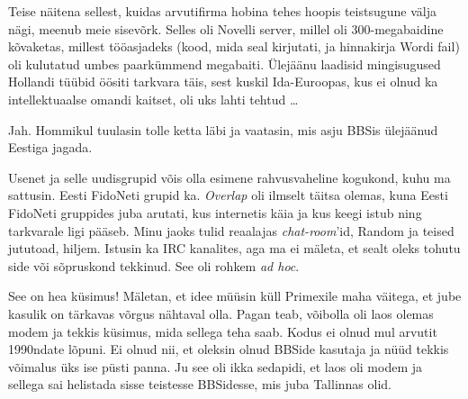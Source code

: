 Teise näitena sellest, kuidas arvutifirma hobina tehes hoopis 
teistsugune välja nägi, meenub meie sisevõrk. Selles oli Novelli server, 
millel oli 300-megabaidine kõvaketas, millest 
tööasjadeks (kood, mida seal 
kirjutati, ja hinnakirja Wordi fail) oli kulutatud umbes paarkümmend megabaiti. Ülejäänu laadisid 
mingisugused Hollandi tüübid öösiti tarkvara täis, sest 
kuskil Ida-Euroopas, kus ei olnud ka intellektuaalse 
omandi kaitset, oli uks lahti tehtud \ldots


Jah. Hommikul tuulasin tolle ketta läbi ja vaatasin, mis asju BBSis ülejäänud 
Eestiga jagada.


Usenet ja selle uudisgrupid võis olla esimene rahvusvaheline
kogukond, kuhu ma sattusin. Eesti FidoNeti grupid ka. \emph{Overlap} oli ilmselt täitsa olemas, kuna Eesti FidoNeti 
gruppides juba arutati, kus internetis käia ja kus keegi istub ning tarkvarale 
ligi pääseb. Minu jaoks tulid reaalajas 
\emph{chat-room}'id, Random ja teised 
jututoad, hiljem. Istusin ka IRC kanalites, aga ma ei mäleta, et sealt 
oleks tohutu side või sõpruskond tekkinud. See oli rohkem 
\emph{ad hoc}. 


See on hea küsimus! Mäletan, et idee müüsin küll Primexile maha väitega, 
et jube kasulik on tärkavas võrgus nähtaval olla. Pagan teab, võibolla oli 
laos olemas modem ja tekkis küsimus, mida sellega teha saab. 
Kodus ei olnud mul arvutit 1990ndate lõpuni. Ei olnud nii, et 
oleksin olnud BBSide kasutaja ja nüüd tekkis võimalus üks ise püsti panna. 
Ju see oli ikka sedapidi, et laos oli modem ja sellega sai helistada sisse 
teistesse BBSidesse, mis juba Tallinnas olid.

